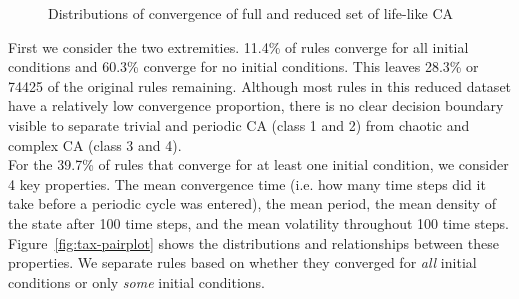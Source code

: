 \begin{figure}[!h]
\centering
            \hfill
            \hfill
            \caption{Distributions of convergence of full and reduced set of life-like CA}
\label{fig:taxonomy-dist}
\end{figure}

First we consider the two extremities. 11.4\% of rules converge for all initial conditions and 60.3\% converge for no initial conditions. This leaves 28.3\% or 74425 of the original rules remaining. Although most rules in this reduced dataset have a relatively low convergence proportion, there is no clear decision boundary visible to separate trivial and periodic CA (class 1 and 2) from chaotic and complex CA (class 3 and 4).\\

For the 39.7\% of rules that converge for at least one initial condition, we consider 4 key properties. The mean convergence time (i.e. how many time steps did it take before a periodic cycle was entered), the mean period, the mean density of the state after 100 time steps, and the mean volatility throughout 100 time steps. Figure~\ref{fig:tax-pairplot} shows the distributions and relationships between these properties. We separate rules based on whether they converged for \textit{all} initial conditions or only \textit{some} initial conditions.\\

